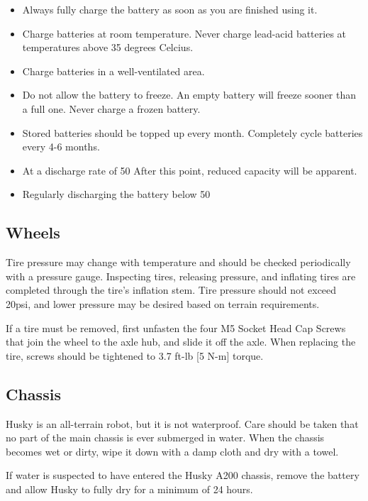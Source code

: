 \documentclass[]{clearpath-latex/clearpath-manual}
\begin{document}
\begin{itemize}
	\item Always fully charge the battery as soon as you are finished using it.
	\item Charge batteries at room temperature.  Never charge lead-acid batteries at temperatures above 35 degrees Celcius.
	\item Charge batteries in a well-ventilated area.
	\item Do not allow the battery to freeze.  An empty battery will freeze sooner than a full one.  Never charge a frozen battery.
	\item Stored batteries should be topped up every month.  Completely cycle batteries every 4-6 months.
	\item At a discharge rate of 50%
	After this point, reduced capacity will be apparent.
	\item Regularly discharging the battery below 50%
\end{itemize}

\subsection{Wheels}
Tire pressure may change with temperature and should be checked periodically with a pressure gauge. 
Inspecting tires, releasing pressure, and inflating tires are completed through the tire’s inflation stem. 
Tire pressure should not exceed 20psi, and lower pressure may be desired based on terrain requirements.

If a tire must be removed, first unfasten the four M5 Socket Head Cap Screws that join the wheel to the axle hub,
and slide it off the axle. When replacing the tire, screws should be tightened to 3.7 ft-lb [5 N-m] torque.

\subsection{Chassis}
Husky is an all-terrain robot, but it is not waterproof. Care should be taken that no part of the main 
chassis is ever submerged in water. When the chassis becomes wet or dirty, wipe it down with a damp cloth 
and dry with a towel.

If water is suspected to have entered the Husky A200 chassis, remove the battery and allow Husky to fully dry for a minimum of 24 hours.
\end{document}
